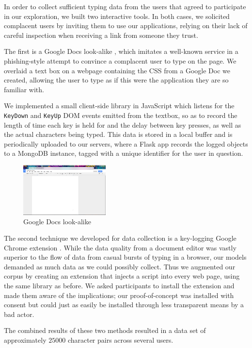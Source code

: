 \documentclass[9pt,journal]{IEEEtran}
\begin{document}
In order to collect sufficient typing data from the users that agreed to participate in our exploration, we built two interactive tools. In both cases, we solicited complacent users by inviting them to use our applications, relying on their lack of careful inspection when receiving a link from someone they trust.

The first is a Google Docs look-alike \cite{gdocs}, which imitates a well-known service in a phishing-style attempt to convince a complacent user to type on the page. We overlaid a text box on a webpage containing the CSS from a Google Doc we created, allowing the user to type as if this were the application they are so familiar with.

We implemented a small client-side library in JavaScript which listens for the \texttt{KeyDown} and \texttt{KeyUp} DOM events emitted from the textbox, so as to record the length of time each key is held for and the delay between key presses, as well as the actual characters being typed. This data is stored in a local buffer and is periodically uploaded to our servers, where a Flask app records the logged objects to a MongoDB instance, tagged with a unique identifier for the user in question.

\begin{figure}[H]
  \centering
  \includegraphics[width=0.4\textwidth]{gdocs}
  \caption{Google Docs look-alike}
\end{figure}

The second technique we developed for data collection is a key-logging Google Chrome extension \cite{extension}. While the data quality from a document editor was vastly superior to the flow of data from casual bursts of typing in a browser, our models demanded as much data as we could possibly collect. Thus we augmented our corpus by creating an extension that injects a script into every web page, using the same library as before. We asked participants to install the extension and made them aware of the implications; our proof-of-concept was installed with consent but could just as easily be installed through less transparent means by a bad actor.

The combined results of these two methods resulted in a data set of approximately $25000$ character pairs across several users.
\end{document}
